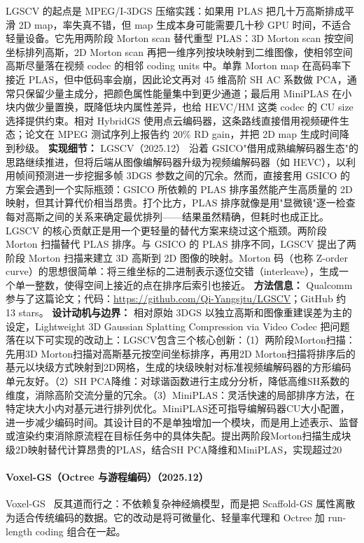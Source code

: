 LGSCV 的起点是 MPEG/I-3DGS 压缩实践：如果用 PLAS 把几十万高斯排成平滑 2D map，率失真不错，但 map 生成本身可能需要几十秒 GPU 时间，不适合轻量设备。它先用两阶段 Morton scan 替代重型 PLAS：3D Morton scan 按空间坐标排列高斯，2D Morton scan 再把一维序列按块映射到二维图像，使相邻空间高斯尽量落在视频 codec 的相邻 coding units 中。单靠 Morton map 在高码率下接近 PLAS，但中低码率会崩，因此论文再对 45 维高阶 SH AC 系数做 PCA，通常只保留少量主成分，把颜色属性能量集中到更少通道；最后用 MiniPLAS 在小块内做少量置换，既降低块内属性差异，也给 HEVC/HM 这类 codec 的 CU size 选择提供约束。相对 HybridGS 使用点云编码器，这条路线直接借用视频硬件生态；论文在 MPEG 测试序列上报告约 20\% RD gain，并把 2D map 生成时间降到秒级。
\textbf{实现细节：} LGSCV（2025.12） 沿着 GSICO"借用成熟编解码器生态"的思路继续推进，但将后端从图像编解码器升级为视频编解码器（如 HEVC），以利用帧间预测进一步挖掘多帧 3DGS 参数之间的冗余。然而，直接套用 GSICO 的方案会遇到一个实际瓶颈：GSICO 所依赖的 PLAS 排序虽然能产生高质量的 2D 映射，但其计算代价相当昂贵。打个比方，PLAS 排序就像是用"显微镜"逐一检查每对高斯之间的关系来确定最优排列——结果虽然精确，但耗时也成正比。LGSCV 的核心贡献正是用一个更轻量的替代方案来绕过这个瓶颈。两阶段 Morton 扫描替代 PLAS 排序。与 GSICO 的 PLAS 排序不同，LGSCV 提出了两阶段 Morton 扫描来建立 3D 高斯到 2D 图像的映射。Morton 码（也称 Z-order curve）的思想很简单：将三维坐标的二进制表示逐位交错（interleave），生成一个单一整数，使得空间上接近的点在排序后索引也接近。
\textbf{方法信息：} Qualcomm 参与了这篇论文；代码：\url{https://github.com/Qi-Yangsjtu/LGSCV}；GitHub 约 13 stars。
\textbf{设计动机与边界：} 相对原始 3DGS 以独立高斯和图像重建误差为主的设定，Lightweight 3D Gaussian Splatting Compression via Video Codec 把问题落在以下可实现的改动上：LGSCV包含三个核心创新：（1）两阶段Morton扫描：先用3D Morton扫描对高斯基元按空间坐标排序，再用2D Morton扫描将排序后的基元以块级方式映射到2D网格，生成的块级映射对标准视频编解码器的方形编码单元友好。（2）SH PCA降维：对球谐函数进行主成分分析，降低高维SH系数的维度，消除高阶交流分量的冗余。（3）MiniPLAS：灵活快速的局部排序方法，在特定块大小内对基元进行排列优化。MiniPLAS还可指导编解码器CU大小配置，进一步减少编码时间。其设计目的不是单独增加一个模块，而是用上述表示、监督或渲染约束消除原流程在目标任务中的具体失配。提出两阶段Morton扫描生成块级2D映射替代计算昂贵的PLAS，结合SH PCA降维和MiniPLAS，实现超过20%
\paragraph{Voxel-GS（Octree 与游程编码）（2025.12）}
Voxel-GS~\cite{2512_17528} 反其道而行之：不依赖复杂神经熵模型，而是把 Scaffold-GS 属性离散为适合传统编码的数据。它的改动是将可微量化、轻量率代理和 Octree 加 run-length coding 组合在一起。

